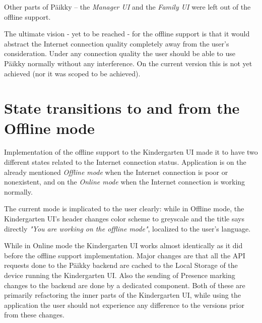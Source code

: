 Other parts of Päikky – the \textit{Manager UI} and the \textit{Family UI} were left out of the offline support.

The ultimate vision - yet to be reached - for the offline support is that it would abstract the Internet connection quality completely away from the user's consideration. Under any connection quality the user should be able to use Päikky normally without any interference. On the current version this is not yet achieved (nor it was scoped to be achieved). %




\section{State transitions to and from the Offline mode}

Implementation of the offline support to the Kindergarten UI made it to have two different states related to the Internet connection status. Application is on the already mentioned \textit{Offline mode} when the Internet connection is poor or nonexistent, and on the \textit{Online mode} when the Internet connection is working normally. 

The current mode is implicated to the user clearly: while in Offline mode, the Kindergarten UI's header changes color scheme to greyscale and the title says directly \textit{"You are working on the offline mode"}, localized to the user's language.

While in Online mode the Kindergarten UI works almost identically as it did before the offline support implementation. Major changes are that all the API requests done to the Päikky backend are cached to the Local Storage of the device running the Kindergarten UI. Also the sending of Presence marking changes to the backend are done by a dedicated component. Both of these are primarily refactoring the inner parts of the Kindergarten UI, while using the application the user should not experience any difference to the versions prior from these changes.

